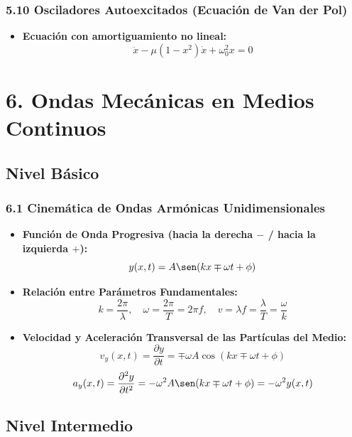 \documentclass[11pt,a4paper]{article}
\begin{document}
\subsubsection*{5.10 Osciladores Autoexcitados (Ecuación de Van der Pol)}

\begin{itemize}
  \item \textbf{Ecuación con amortiguamiento no lineal:}
  \[
    \ddot{x} - \mu(1 - x^2)\dot{x} + \omega_0^2 x = 0
  \]
\end{itemize}

\section*{6. Ondas Mecánicas en Medios Continuos}

\subsection*{Nivel Básico}

\subsubsection*{6.1 Cinemática de Ondas Armónicas Unidimensionales}

\begin{itemize}
  \item \textbf{Función de Onda Progresiva (hacia la derecha $-$ / hacia la izquierda $+$):}
  \[
    y(x, t) = A \sen(k x \mp \omega t + \phi)
  \]
  \item \textbf{Relación entre Parámetros Fundamentales:}
  \[
    k = \frac{2\pi}{\lambda}, \quad \omega = \frac{2\pi}{T} = 2\pi f, \quad v = \lambda f = \frac{\lambda}{T} = \frac{\omega}{k}
  \]
  \item \textbf{Velocidad y Aceleración Transversal de las Partículas del Medio:}
  \[
    v_y(x, t) = \frac{\partial y}{\partial t} = \mp \omega A \cos(k x \mp \omega t + \phi)
  \]
  \[
    a_y(x, t) = \frac{\partial^2 y}{\partial t^2} = -\omega^2 A \sen(k x \mp \omega t + \phi) = -\omega^2 y(x, t)
  \]
\end{itemize}

\subsection*{Nivel Intermedio}
\end{document}
